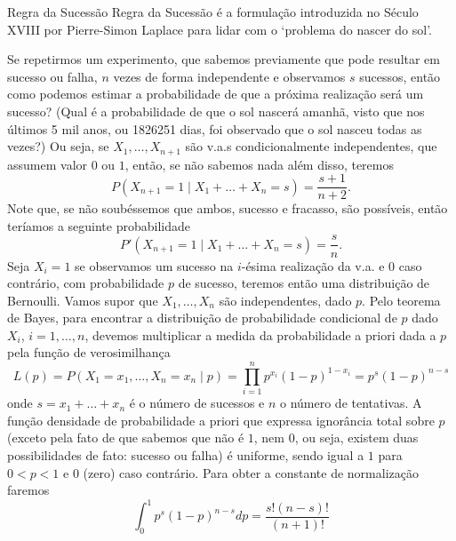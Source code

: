 \begin{frame}[allowframebreaks]
  \framebreak

  \begin{block}{Regra da Sucessão}
  Regra da Sucessão é a formulação introduzida no Século XVIII por Pierre-Simon Laplace para lidar com o `problema do nascer do sol'. 

  Se repetirmos um experimento, que sabemos previamente que pode resultar em sucesso ou falha, $n$ vezes de forma independente e 
  observamos $s$ sucessos, então como podemos estimar a probabilidade de que a próxima realização será um sucesso? 
  (Qual é a probabilidade de que o sol nascerá amanhã, visto que nos últimos 5 mil anos, ou 1826251 dias, foi observado que o sol nasceu todas as vezes?) 
  \blockbreak
  Ou seja, se $X_1, \ldots, X_{n+1}$ são v.a.s condicionalmente independentes, que assumem valor $0$ ou $1$, então, se não sabemos nada além disso,
  teremos
	\begin{equation}
	P(X_{n+1} = 1 \mid X_1 + \ldots + X_n = s) = \frac{ s+ 1}{n+2} .
	\end{equation}
  Note que, se não soubéssemos que ambos, sucesso e fracasso, são possíveis, então teríamos a seguinte probabilidade
        \begin{equation}
        P'(X_{n+1} = 1 \mid X_1 + \ldots + X_n = s) = \frac{s}{n} .
        \end{equation}
  \blockbreak
  Seja $X_i = 1$ se observamos um sucesso na $i$-ésima realização da v.a. e $0$ caso contrário, com probabilidade $p$ de sucesso,
  teremos então uma distribuição de Bernoulli. Vamos supor que $X_1 , \ldots, X_n$ são independentes, dado $p$.
  Pelo teorema de Bayes, para encontrar a distribuição de probabilidade condicional de $p$ dado $X_i$, $i=1,\ldots,n$, devemos
  multiplicar a medida da probabilidade a priori dada a $p$ pela função de verosimilhança 
	\begin{equation}
	L(p) = P(X_1 = x_1, \ldots, X_n = x_n \mid p) = \prod_{i=1}^n p^{x_i} (1-p)^{1-x_i} = p^s (1-p)^{n-s}
        \end{equation}
  onde $s=x_1 + \ldots + x_n$ é o número de sucessos e $n$ o número de tentativas.
  \blockbreak
  A função densidade de probabilidade a priori que expressa ignorância total sobre $p$ (exceto pela fato de que sabemos
  que não é $1$, nem $0$, ou seja, existem duas possibilidades de fato: sucesso ou falha) é uniforme, sendo igual a
  $1$ para $0 < p < 1$ e $0$ (zero) caso contrário. Para obter a constante de normalização faremos
        \begin{equation}
	\int_0^1 p^s(1-p)^{n-s} dp = \frac{s! (n-s)!}{(n+1)!}

\end{equation}
\end{block}
\end{frame}
